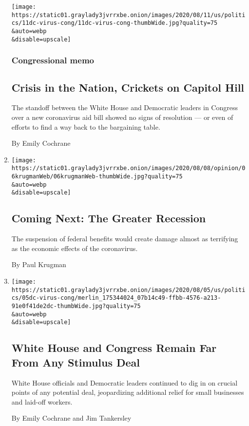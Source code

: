 \begin{enumerate}
  \texttt{[image: https://static01.graylady3jvrrxbe.onion/images/2020/08/11/us/politics/11dc-virus-cong/11dc-virus-cong-thumbWide.jpg?quality=75\\\&auto=webp\\\&disable=upscale]}

  \hypertarget{congressional-memo}{%
  \subsubsection{Congressional memo}\label{congressional-memo}}

  \hypertarget{crisis-in-the-nation-crickets-on-capitol-hill}{%
  \subsection{Crisis in the Nation, Crickets on Capitol
  Hill}\label{crisis-in-the-nation-crickets-on-capitol-hill}}

  The standoff between the White House and Democratic leaders in
  Congress over a new coronavirus aid bill showed no signs of resolution
  --- or even of efforts to find a way back to the bargaining table.

  By Emily Cochrane
\item
  \href{/2020/08/06/opinion/coronavirus-us-recession.html}{}

  \texttt{[image: https://static01.graylady3jvrrxbe.onion/images/2020/08/08/opinion/06krugmanWeb/06krugmanWeb-thumbWide.jpg?quality=75\\\&auto=webp\\\&disable=upscale]}

  \hypertarget{coming-next-the-greater-recession}{%
  \subsection{Coming Next: The Greater
  Recession}\label{coming-next-the-greater-recession}}

  The suspension of federal benefits would create damage almost as
  terrifying as the economic effects of the coronavirus.

  By Paul Krugman
\item
  \href{/2020/08/05/us/politics/congress-coronavirus-stimulus.html}{}

  \texttt{[image: https://static01.graylady3jvrrxbe.onion/images/2020/08/05/us/politics/05dc-virus-cong/merlin\_175344024\_07b14c49-ffbb-4576-a213-91e0f41de2dc-thumbWide.jpg?quality=75\\\&auto=webp\\\&disable=upscale]}

  \hypertarget{white-house-and-congress-remain-far-from-any-stimulus-deal}{%
  \subsection{White House and Congress Remain Far From Any Stimulus
  Deal}\label{white-house-and-congress-remain-far-from-any-stimulus-deal}}

  White House officials and Democratic leaders continued to dig in on
  crucial points of any potential deal, jeopardizing additional relief
  for small businesses and laid-off workers.

  By Emily Cochrane and Jim Tankersley
\end{enumerate}

